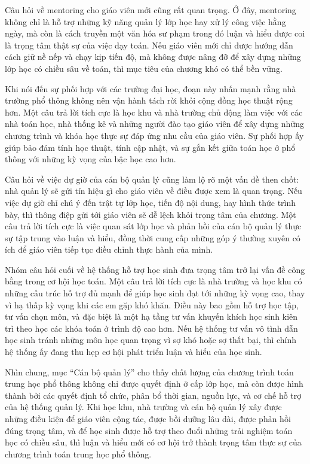 \documentclass[
  10pt,
  a4paper,
  landscape,
  twoside,
  openany
]{scrbook}
\begin{document}
{{Câu hỏi về mentoring cho giáo viên mới cũng rất quan trọng. Ở đây, mentoring không chỉ là hỗ trợ những kỹ năng quản lý lớp học hay xử lý công việc hằng ngày, mà còn là cách truyền một văn hóa sư phạm trong đó luận và hiểu được coi là trọng tâm thật sự của việc dạy toán. Nếu giáo viên mới chỉ được hướng dẫn cách giữ nề nếp và chạy kịp tiến độ, mà không được nâng đỡ để xây dựng những lớp học có chiều sâu về toán, thì mục tiêu của chương khó có thể bền vững.

Khi nói đến sự phối hợp với các trường đại học, đoạn này nhấn mạnh rằng nhà trường phổ thông không nên vận hành tách rời khỏi cộng đồng học thuật rộng hơn. Một câu trả lời tích cực là học khu và nhà trường chủ động làm việc với các nhà toán học, nhà thống kê và những người đào tạo giáo viên để xây dựng những chương trình và khóa học thực sự đáp ứng nhu cầu của giáo viên. Sự phối hợp ấy giúp bảo đảm tính học thuật, tính cập nhật, và sự gắn kết giữa toán học ở phổ thông với những kỳ vọng của bậc học cao hơn.

Câu hỏi về việc dự giờ của cán bộ quản lý cũng làm lộ rõ một vấn đề then chốt: nhà quản lý sẽ gửi tín hiệu gì cho giáo viên về điều được xem là quan trọng. Nếu việc dự giờ chỉ chú ý đến trật tự lớp học, tiến độ nội dung, hay hình thức trình bày, thì thông điệp gửi tới giáo viên sẽ dễ lệch khỏi trọng tâm của chương. Một câu trả lời tích cực là việc quan sát lớp học và phản hồi của cán bộ quản lý thực sự tập trung vào luận và hiểu, đồng thời cung cấp những góp ý thường xuyên có ích để giáo viên tiếp tục điều chỉnh thực hành của mình.

Nhóm câu hỏi cuối về hệ thống hỗ trợ học sinh đưa trọng tâm trở lại vấn đề công bằng trong cơ hội học toán. Một câu trả lời tích cực là nhà trường và học khu có những cấu trúc hỗ trợ đủ mạnh để giúp học sinh đạt tới những kỳ vọng cao, thay vì hạ thấp kỳ vọng khi các em gặp khó khăn. Điều này bao gồm hỗ trợ học tập, tư vấn chọn môn, và đặc biệt là một hạ tầng tư vấn khuyến khích học sinh kiên trì theo học các khóa toán ở trình độ cao hơn. Nếu hệ thống tư vấn vô tình dẫn học sinh tránh những môn học quan trọng vì sợ khó hoặc sợ thất bại, thì chính hệ thống ấy đang thu hẹp cơ hội phát triển luận và hiểu của học sinh.

Nhìn chung, mục “Cán bộ quản lý” cho thấy chất lượng của chương trình toán trung học phổ thông không chỉ được quyết định ở cấp lớp học, mà còn được hình thành bởi các quyết định tổ chức, phân bổ thời gian, nguồn lực, và cơ chế hỗ trợ của hệ thống quản lý. Khi học khu, nhà trường và cán bộ quản lý xây được những điều kiện để giáo viên cộng tác, được bồi dưỡng lâu dài, được phản hồi đúng trọng tâm, và để học sinh được hỗ trợ theo đuổi những trải nghiệm toán học có chiều sâu, thì luận và hiểu mới có cơ hội trở thành trọng tâm thực sự của chương trình toán trung học phổ thông.}
}
\end{document}
